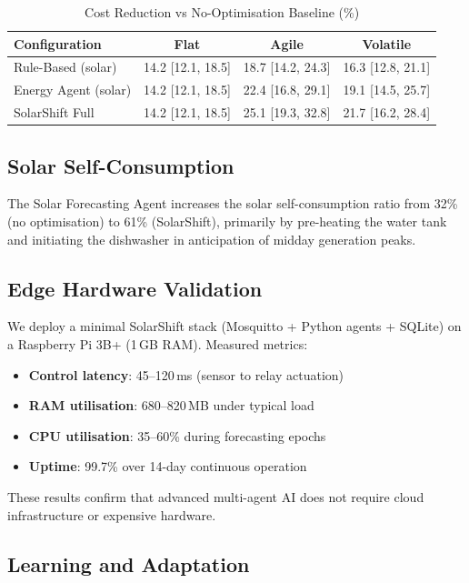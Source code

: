 \documentclass[11pt,a4paper]{article}
\begin{document}
\begin{table}[htbp]
\centering
\caption{Cost Reduction vs No-Optimisation Baseline (\%)}
\label{tab:solar_results}
\begin{tabular}{@{}lccc@{}}
\toprule
\textbf{Configuration} & \textbf{Flat} & \textbf{Agile} & \textbf{Volatile} \\
\midrule
Rule-Based (solar) & 14.2 [12.1, 18.5] & 18.7 [14.2, 24.3] & 16.3 [12.8, 21.1] \\
Energy Agent (solar) & 14.2 [12.1, 18.5] & 22.4 [16.8, 29.1] & 19.1 [14.5, 25.7] \\
SolarShift Full & 14.2 [12.1, 18.5] & 25.1 [19.3, 32.8] & 21.7 [16.2, 28.4] \\
\bottomrule
\end{tabular}
\end{table}

\subsection{Solar Self-Consumption}

The Solar Forecasting Agent increases the solar self-consumption ratio from 32\% (no optimisation) to 61\% (SolarShift), primarily by pre-heating the water tank and initiating the dishwasher in anticipation of midday generation peaks.

\subsection{Edge Hardware Validation}

We deploy a minimal SolarShift stack (Mosquitto + Python agents + SQLite) on a Raspberry Pi 3B+ (1\,GB RAM). Measured metrics:
\begin{itemize}
    \item \textbf{Control latency}: 45--120\,ms (sensor to relay actuation)
    \item \textbf{RAM utilisation}: 680--820\,MB under typical load
    \item \textbf{CPU utilisation}: 35--60\% during forecasting epochs
    \item \textbf{Uptime}: 99.7\% over 14-day continuous operation
\end{itemize}

These results confirm that advanced multi-agent AI does not require cloud infrastructure or expensive hardware.

\subsection{Learning and Adaptation}
\end{document}
